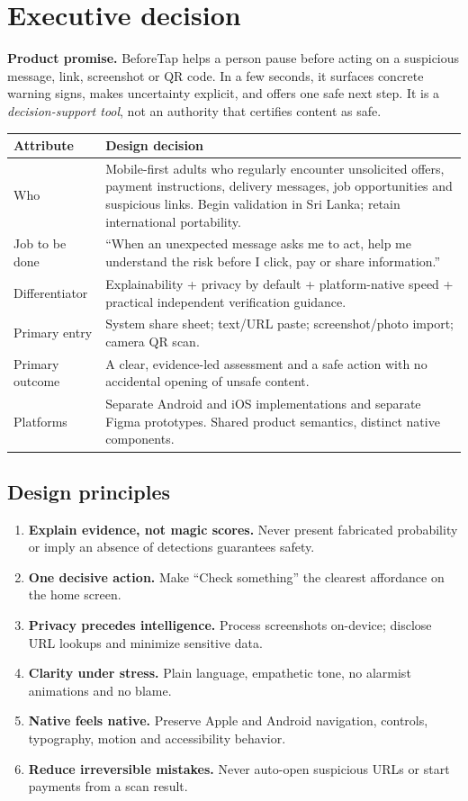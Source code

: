 \documentclass[10pt,a4paper]{article}
\begin{document}
\section{Executive decision}
\begin{greenbox}
\textbf{Product promise.} BeforeTap helps a person pause before acting on a suspicious message, link, screenshot or QR code. In a few seconds, it surfaces concrete warning signs, makes uncertainty explicit, and offers one safe next step. It is a \emph{decision-support tool}, not an authority that certifies content as safe.
\end{greenbox}
\begin{tabularx}{\linewidth}{@{}p{31mm}Y@{}}\toprule
\textbf{Attribute} & \textbf{Design decision} \\ \midrule
Who & Mobile-first adults who regularly encounter unsolicited offers, payment instructions, delivery messages, job opportunities and suspicious links. Begin validation in Sri Lanka; retain international portability. \\
Job to be done & ``When an unexpected message asks me to act, help me understand the risk before I click, pay or share information.'' \\
Differentiator & Explainability + privacy by default + platform-native speed + practical independent verification guidance. \\
Primary entry & System share sheet; text/URL paste; screenshot/photo import; camera QR scan. \\
Primary outcome & A clear, evidence-led assessment and a safe action with no accidental opening of unsafe content. \\
Platforms & Separate Android and iOS implementations and separate Figma prototypes. Shared product semantics, distinct native components. \\
\bottomrule\end{tabularx}

\subsection{Design principles}
\begin{enumerate}
\item \textbf{Explain evidence, not magic scores.} Never present fabricated probability or imply an absence of detections guarantees safety.
\item \textbf{One decisive action.} Make ``Check something'' the clearest affordance on the home screen.
\item \textbf{Privacy precedes intelligence.} Process screenshots on-device; disclose URL lookups and minimize sensitive data.
\item \textbf{Clarity under stress.} Plain language, empathetic tone, no alarmist animations and no blame.
\item \textbf{Native feels native.} Preserve Apple and Android navigation, controls, typography, motion and accessibility behavior.
\item \textbf{Reduce irreversible mistakes.} Never auto-open suspicious URLs or start payments from a scan result.
\end{enumerate}
\end{document}
